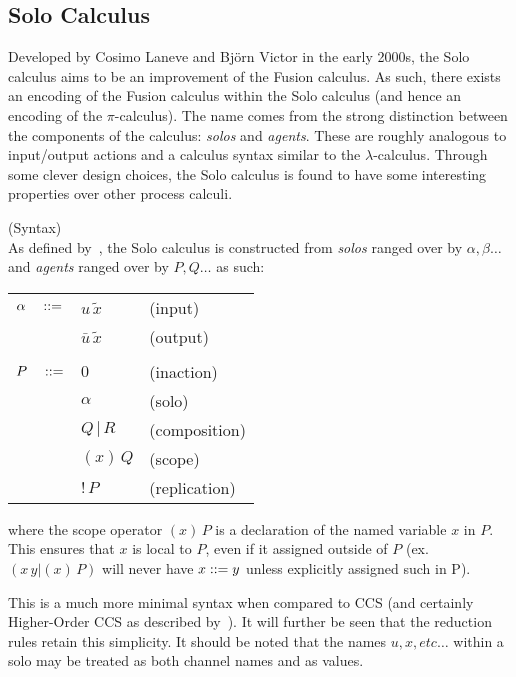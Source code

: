 \subsection{Solo Calculus}
    Developed by Cosimo Laneve and Bj{\"o}rn Victor in the early 2000s, the Solo calculus aims to be an improvement of the Fusion calculus.
    As such, there exists an encoding of the Fusion calculus within the Solo calculus (and hence an encoding of the $\pi$-calculus).
    The name comes from the strong distinction between the components of the calculus: \textit{solos} and \textit{agents}.
    These are roughly analogous to input/output actions and a calculus syntax similar to the $\lambda$-calculus.
    Through some clever design choices, the Solo calculus is found to have some interesting properties over other process calculi.

    \begin{definition}{(Syntax)\\}
        \label{solo-calculus-syntax}
        As defined by~\cite{solo-calculus}, the Solo calculus is constructed from \textit{solos} ranged over by $\alpha, \beta \ldots$ and \textit{agents} ranged over by $P, Q \ldots$ as such:
        \begin{center}
            \begin{tabular}{ l l l }
                $\alpha \quad ::=$   & $u \, \tilde{x}$          & (input) \\
                                        & $\bar{u} \, \tilde{x}$    & (output)~\footnotemark\\ \\
                $P \quad ::=$        & $0$                       & (inaction) \\
                                        & $\alpha$                  & (solo) \\
                                        & $Q \, | \, R$             & (composition) \\
                                        & $(x) \, Q$                & (scope) \\
                                        & $!\,P$                    & (replication)
            \end{tabular}
        \end{center}
        where the scope operator $(x) \, P $ is a declaration of the named variable $x$ in $P$.
        This ensures that $x$ is local to $P$, even if it assigned outside of $P$ (ex. $(x \, y | (x) \, P)$ will never have $x ::= y$ unless explicitly assigned such in P).
    \end{definition}
    This is a much more minimal syntax when compared to CCS (and certainly Higher-Order CCS as described by~\cite{pi-calculus-in-ccs}).
    It will further be seen that the reduction rules retain this simplicity.
    It should be noted that the names $u, x, etc\ldots$ within a solo may be treated as both channel names and as values.


